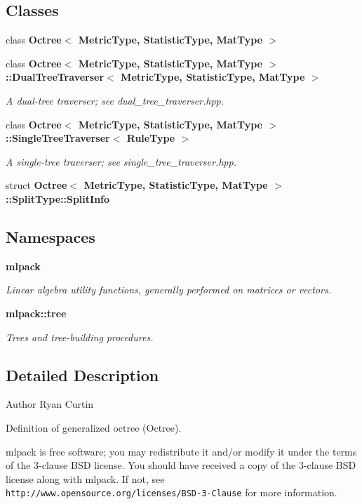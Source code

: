\subsection*{Classes}
\begin{DoxyCompactItemize}
\item 
class \textbf{ Octree$<$ Metric\+Type, Statistic\+Type, Mat\+Type $>$}
\item 
class \textbf{ Octree$<$ Metric\+Type, Statistic\+Type, Mat\+Type $>$\+::\+Dual\+Tree\+Traverser$<$ Metric\+Type, Statistic\+Type, Mat\+Type $>$}
\begin{DoxyCompactList}\small\item\em A dual-\/tree traverser; see dual\+\_\+tree\+\_\+traverser.\+hpp. \end{DoxyCompactList}\item 
class \textbf{ Octree$<$ Metric\+Type, Statistic\+Type, Mat\+Type $>$\+::\+Single\+Tree\+Traverser$<$ Rule\+Type $>$}
\begin{DoxyCompactList}\small\item\em A single-\/tree traverser; see single\+\_\+tree\+\_\+traverser.\+hpp. \end{DoxyCompactList}\item 
struct \textbf{ Octree$<$ Metric\+Type, Statistic\+Type, Mat\+Type $>$\+::\+Split\+Type\+::\+Split\+Info}
\end{DoxyCompactItemize}
\subsection*{Namespaces}
\begin{DoxyCompactItemize}
\item 
 \textbf{ mlpack}
\begin{DoxyCompactList}\small\item\em Linear algebra utility functions, generally performed on matrices or vectors. \end{DoxyCompactList}\item 
 \textbf{ mlpack\+::tree}
\begin{DoxyCompactList}\small\item\em Trees and tree-\/building procedures. \end{DoxyCompactList}\end{DoxyCompactItemize}


\subsection{Detailed Description}
\begin{DoxyAuthor}{Author}
Ryan Curtin
\end{DoxyAuthor}
Definition of generalized octree (Octree).

mlpack is free software; you may redistribute it and/or modify it under the terms of the 3-\/clause B\+SD license. You should have received a copy of the 3-\/clause B\+SD license along with mlpack. If not, see {\tt http\+://www.\+opensource.\+org/licenses/\+B\+S\+D-\/3-\/\+Clause} for more information. 